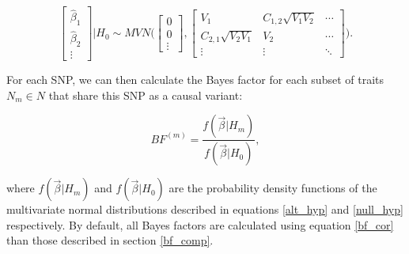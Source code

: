 \documentclass{article}
\begin{document}
\begin{equation}
\label{null_hyp}
\begin{bmatrix}
\hat{\beta}_1 \\
\hat{\beta}_2 \\
\vdots
\end{bmatrix} | H_0
\sim MVN \Bigg(
\begin{bmatrix}
0 \\
0 \\
\vdots
\end{bmatrix},
\begin{bmatrix}
V_1 & C_{1,2} \sqrt{V_1 V_2} & \cdots \\
C_{2,1} \sqrt{V_2 V_1} & V_2 & \cdots \\
\vdots & \vdots & \ddots
\end{bmatrix}
\Bigg).
\end{equation}


\noindent For each SNP, we can then calculate the Bayes factor for each subset of traits $N_m \in N$ that share this SNP as a causal variant:

\begin{equation}
\label{bf_cor}
BF^(m) = \frac{f(\vec{\beta}| H_m)}{f(\vec{\beta}| H_0)},
\end{equation}

\noindent where $f(\vec{\beta}| H_m)$ and $f(\vec{\beta}| H_0)$ are the probability density functions of the multivariate normal distributions described in equations \ref{alt_hyp} and \ref{null_hyp} respectively. By default, all Bayes factors are calculated using equation \ref{bf_cor} than those described in section \ref{bf_comp}.




\end{document}
